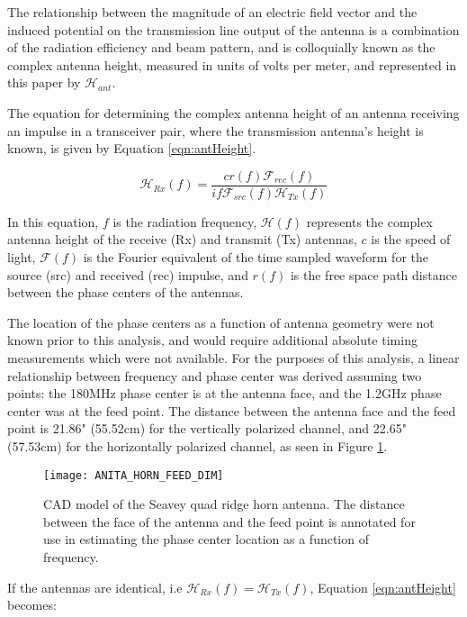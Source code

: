 		The relationship between the magnitude of an electric field vector and the induced potential on the transmission line output of the antenna is a combination of the radiation efficiency and beam pattern, and is colloquially known as the complex antenna height, measured in units of volts per meter, and represented in this paper by $\mathcal{H}_{ant}$.
		
		
	The equation for determining the complex antenna height of an antenna receiving an impulse in a transceiver pair, where the transmission antenna's height is known, is given by Equation \ref{eqn:antHeight}. \cite{PhysRevD.74.043002}\cite{EWar}
	
\begin{equation}
\mathcal{H}_{Rx}(f) = \frac{ c r(f) \mathcal{F}_{rec}(f)}{ if \mathcal{F}_{src}(f) \mathcal{H}_{Tx}(f) } 
\label{eqn:antHeight}
\end{equation}

In this equation, $f$ is the radiation frequency, $\mathcal{H}(f)$ represents the complex antenna height of the receive (Rx) and transmit (Tx) antennas, $c$ is the speed of light, $\mathcal{F}(f)$ is the Fourier equivalent of the time sampled waveform for the source (src) and received (rec) impulse, and $r(f)$ is the free space path distance between the phase centers of the antennas.  

The location of the phase centers as a function of antenna geometry were not known prior to this analysis, and would require additional absolute timing measurements which were not available.  For the purposes of this analysis, a linear relationship between frequency and phase center was derived assuming two points: the 180MHz phase center is at the antenna face, and the 1.2GHz phase center was at the feed point.  The distance between the antenna face and the feed point is 21.86" (55.52cm) for the vertically polarized channel, and 22.65" (57.53cm) for the horizontally polarized channel, as seen in Figure \ref{fig:antDim}.

	
\begin{figure}
\centering
	\texttt{[image: ANITA\_HORN\_FEED\_DIM]}
	\caption{CAD model of the Seavey quad ridge horn antenna.  The distance between the face of the antenna and the feed point is annotated for use in estimating the phase center location as a function of frequency.\cite{Christian}}
\label{fig:antDim}
\end{figure}



If the antennas are identical, i.e $\mathcal{H}_{Rx}(f) = \mathcal{H}_{Tx}(f)$, Equation \ref{eqn:antHeight} becomes:

